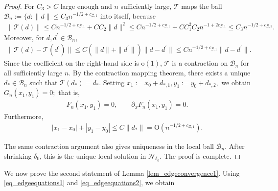 \documentclass[12pt]{article}
\theoremstyle{plain}
\numberwithin{equation}{section}
\begin{document}
\begin{proof}
	For $C_3>C$ large enough and $n$ sufficiently large, $\mathcal T$ maps the
	ball $\mathcal B_n:=\{d:\|d\|\le C_3n^{-1/2+c_{\Xi,1}}$
	into itself, because
	\begin{align*}
		\|\mathcal T(d)\|
		\le
		C n^{-1/2+c_{\Xi,1}}+CC_2\|d\|^2
		\le
		C n^{-1/2+c_{\Xi,1}}+C C_1^2 C_2 n^{-1+2c_{\Xi,1}}
		\le
		C_3n^{-1/2+c_{\Xi,1}}.
	\end{align*}
	Moreover, for $d,d^{\prime}\in\mathcal B_n$,
	\begin{align*}
		\|\mathcal T(d)-\mathcal T(d^{\prime})\|
		\le
		C(\|d\|+\|d^{\prime}\|)\|d-d^{\prime}\|
		\le
		C n^{-1/2+c_{\Xi,1}}\|d-d^{\prime}\|.
	\end{align*}
	Since the coefficient on the right-hand side is $\mathrm{o}(1)$, $\mathcal T$ is a contraction on $\mathcal B_n$ for all sufficiently large $n$. By the contraction mapping theorem, there exists a unique $d_*\in\mathcal B_n$ such that $\mathcal T(d_*)=d_*$. Setting $x_1:=x_0+d_{*,1},
	y_1:=y_0+d_{*,2},$ we obtain $G_n(x_1,y_1)=0;$ that is,
	\begin{align*}
		F_n(x_1,y_1)=0,
		\qquad
		\partial_xF_n(x_1,y_1)=0.
	\end{align*}
	Furthermore,
	\begin{align*}
		|x_1-x_0|+|y_1-y_0|
		\le C\|d_*\|
		=\mathrm{O}(n^{-1/2+c_{\Xi,1}}).
	\end{align*}
	
	The same contraction argument also gives uniqueness in the local ball $\mathcal B_n$. After shrinking $\delta_0$, this is the unique local solution in $\mathcal N_{\delta_0}$. The proof is complete.
\end{proof}
We now prove the second statement of Lemma \ref{lem_edgeconvergence1}. Using \eqref{eq_edgeequations1} and \eqref{eq_edgeequations2}, we obtain
\end{document}
